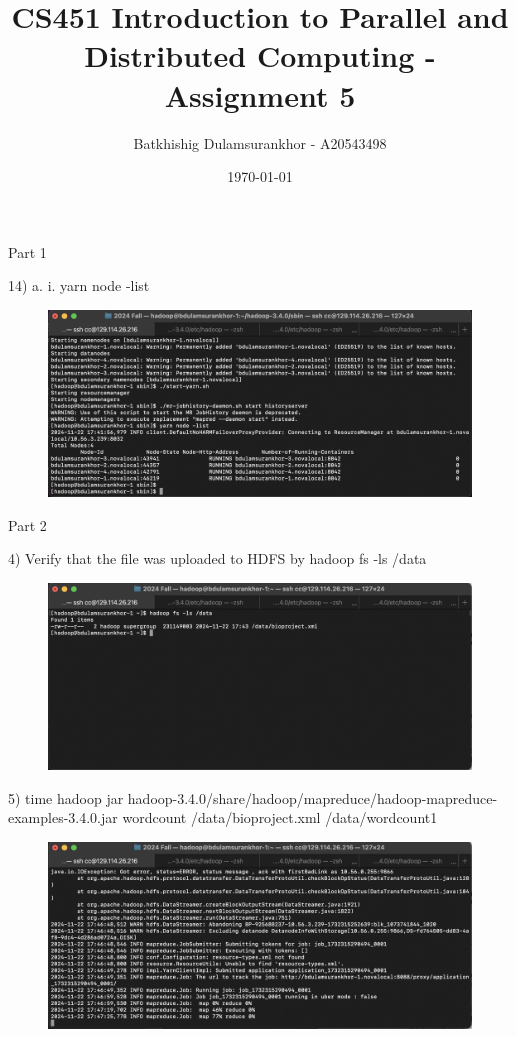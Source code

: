 \documentclass{article}
\title{CS451 Introduction to Parallel and Distributed Computing - Assignment 5}
\author{Batkhishig Dulamsurankhor - A20543498}
\date{\today} %
\begin{document}
\maketitle

Part 1

14) a. i. yarn node -list

\begin{figure}[H]
  \centering
  \includegraphics[width=\textwidth]{image1.png}
\end{figure}

Part 2

4) Verify that the file was uploaded to HDFS by hadoop fs -ls /data
\begin{figure}[H]
  \centering
  \includegraphics[width=\textwidth]{image2.png}
\end{figure}

5) time hadoop jar hadoop-3.4.0/share/hadoop/mapreduce/hadoop-mapreduce-examples-3.4.0.jar wordcount /data/bioproject.xml /data/wordcount1

\begin{figure}[H]
  \centering
  \includegraphics[width=\textwidth]{image3.png}
\end{figure}
\end{document}
